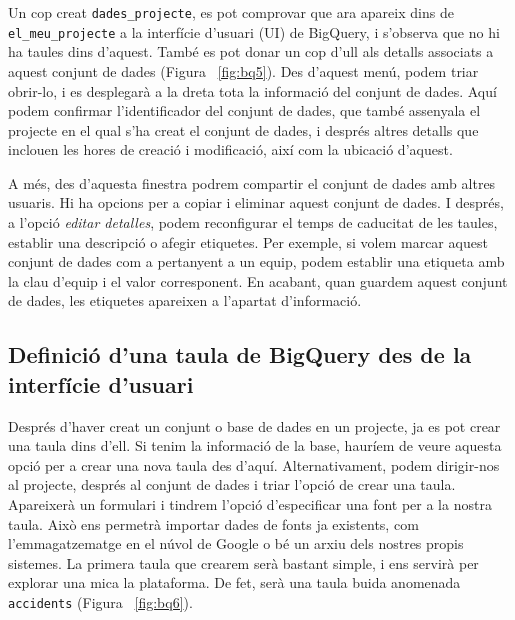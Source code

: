 \documentclass[12pt,longbibliography]{article}
\theoremstyle{definition}
\theoremstyle{remark}
\begin{document}
Un cop creat \verb|dades_projecte|, es pot comprovar que ara apareix dins de \verb|el_meu_projecte| a la interfície d'usuari (UI) de BigQuery, i s'observa que no hi ha taules dins d'aquest. També es pot donar un cop d'ull als detalls associats a aquest conjunt de dades (Figura ~\ref{fig:bq5}). Des d'aquest menú, podem triar obrir-lo, i es desplegarà a la dreta tota la informació del conjunt de dades. Aquí podem confirmar l'identificador del conjunt de dades, que també assenyala el projecte en el qual s'ha creat el conjunt de dades, i després altres detalls que inclouen les hores de creació i modificació, així com la ubicació d'aquest.



A més, des d'aquesta finestra podrem compartir el conjunt de dades amb altres usuaris. Hi ha opcions per a copiar i eliminar aquest conjunt de dades. I després, a l'opció \textit{editar detalles}, podem reconfigurar el temps de caducitat de les taules, establir una descripció o afegir etiquetes. Per exemple, si volem marcar aquest conjunt de dades com a pertanyent a un equip, podem establir una etiqueta amb la clau d'equip i el valor corresponent. En acabant, quan guardem aquest conjunt de dades, les etiquetes apareixen a l'apartat d'informació.

\subsection{Definició d'una taula de BigQuery des de la interfície d'usuari}

Després d'haver creat un conjunt o base de dades en un projecte, ja es pot crear una taula dins d'ell. Si tenim la informació de la base, hauríem de veure aquesta opció per a crear una nova taula des d'aquí. Alternativament, podem dirigir-nos al projecte, després al conjunt de dades i triar l'opció de crear una taula. Apareixerà un formulari i tindrem l'opció d'especificar una font per a la nostra taula. Això ens permetrà importar dades de fonts ja existents, com l'emmagatzematge en el núvol de Google o bé un arxiu dels nostres propis sistemes. La primera taula que crearem serà bastant simple, i ens servirà per explorar una mica la plataforma. De fet, serà una taula buida anomenada \verb|accidents| (Figura ~\ref{fig:bq6}). 
\end{document}
